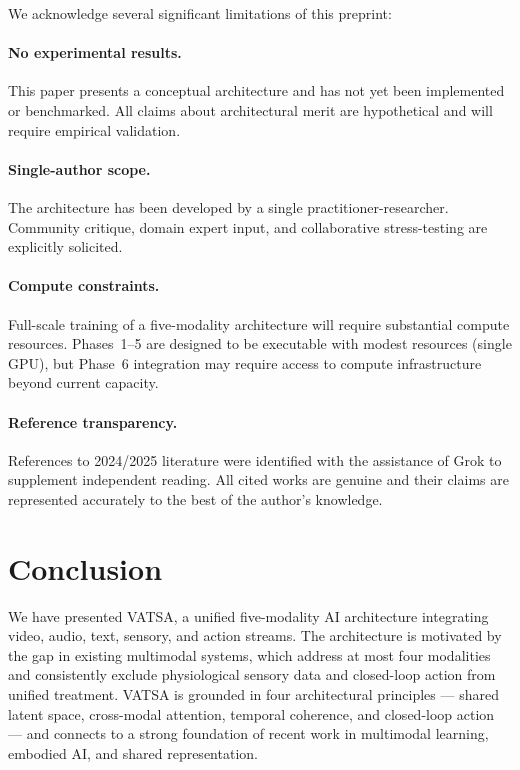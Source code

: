 \documentclass[11pt,a4paper]{article}
\begin{document}
We acknowledge several significant limitations of this preprint:

\paragraph{No experimental results.}
This paper presents a conceptual architecture and has not yet been implemented or
benchmarked.  All claims about architectural merit are hypothetical and will require
empirical validation.

\paragraph{Single-author scope.}
The architecture has been developed by a single practitioner-researcher.  Community
critique, domain expert input, and collaborative stress-testing are explicitly
solicited.

\paragraph{Compute constraints.}
Full-scale training of a five-modality architecture will require substantial compute
resources.  Phases~1--5 are designed to be executable with modest resources (single
GPU), but Phase~6 integration may require access to compute infrastructure beyond
current capacity.

\paragraph{Reference transparency.}
References to 2024/2025 literature were identified with the assistance of Grok to
supplement independent reading.  All cited works are genuine and their claims are
represented accurately to the best of the author's knowledge.

\section{Conclusion}
\label{sec:conclusion}

We have presented VATSA, a unified five-modality AI architecture integrating video,
audio, text, sensory, and action streams.  The architecture is motivated by the gap in
existing multimodal systems, which address at most four modalities and consistently
exclude physiological sensory data and closed-loop action from unified treatment.
VATSA is grounded in four architectural principles --- shared latent space, cross-modal
attention, temporal coherence, and closed-loop action --- and connects to a strong
foundation of recent work in multimodal learning, embodied AI, and shared
representation.
\end{document}
